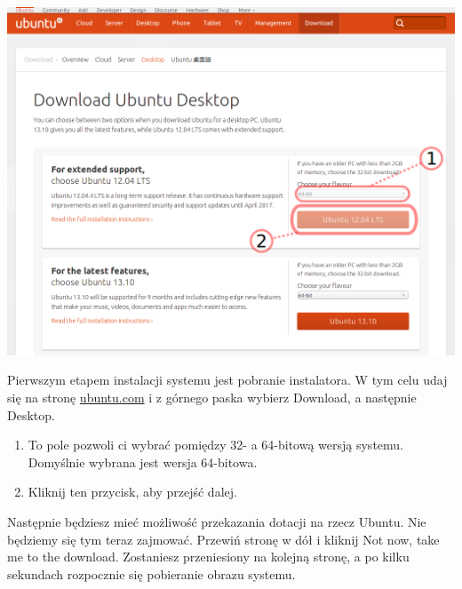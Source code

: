 \begin{center}
	\includegraphics[width=\linewidth]{images/instalacja_pobieranie_obrazu.png}
\end{center}

Pierwszym etapem instalacji systemu jest pobranie instalatora. W tym celu udaj się na stronę \href{http://www.ubuntu.com/download/desktop}{ubuntu.com} i z górnego paska wybierz \textcolor{ubuntu_orange}{Download}, a następnie \textcolor{ubuntu_orange}{Desktop}.
\begin{enumerate}[label=\protect\circled{\arabic*}]
\item To pole pozwoli ci wybrać pomiędzy 32- a 64-bitową wersją systemu. Domyślnie wybrana jest wersja 64-bitowa.
\item Kliknij ten przycisk, aby przejść dalej.
\end{enumerate}

Następnie będziesz mieć możliwość przekazania dotacji na rzecz Ubuntu. Nie będziemy się tym teraz zajmować. Przewiń stronę w dół i kliknij \textcolor{ubuntu_orange}{Not now, take me to the download}. Zostaniesz przeniesiony na kolejną stronę, a po kilku sekundach rozpocznie się pobieranie obrazu systemu.

